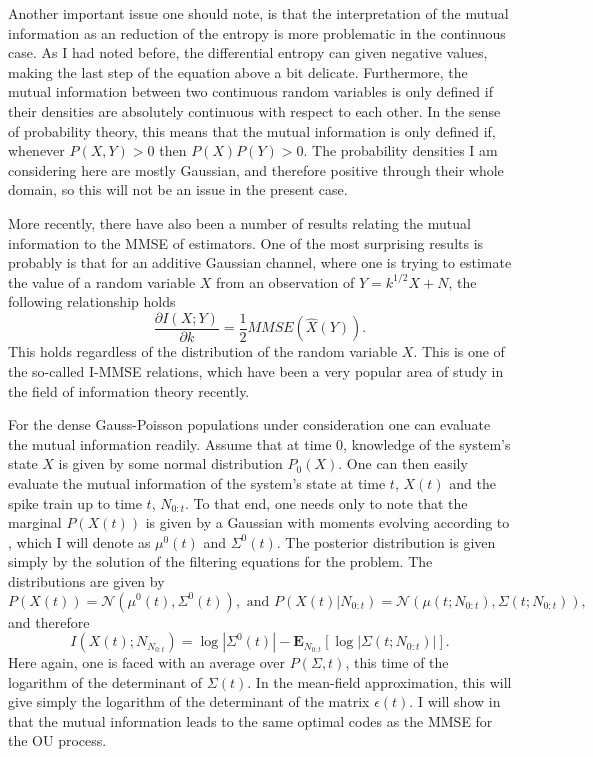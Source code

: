 Another important issue one should note, is that the interpretation of the mutual information as an reduction of the entropy is more problematic in the continuous case. As I had noted 
before, the differential entropy can given negative values, making the last step of the equation above a bit delicate. Furthermore, the mutual information between two continuous 
random variables is only defined if their densities are absolutely continuous with respect to each other. In the sense of probability theory, this means that the mutual information is only
defined if, whenever $P(X,Y) > 0$ then $P(X)P(Y) > 0$. The probability densities I am considering here are mostly Gaussian, and therefore positive through their whole domain, so
this will not be an issue in the present case.\par

More recently, there have also been a number of results relating the mutual information to the MMSE of estimators. One of the most surprising results is probably is that for an additive
Gaussian channel, where one is trying to estimate the value of a random variable $X$ from an observation of $Y = k^{1/2} X + N$, the following relationship holds
\[
\frac{\partial I(X;Y)}{\partial k} = \frac{1}{2} MMSE(\hat{X}(Y)).
\]
This holds regardless of the distribution of the random variable $X$.
This is one of the so-called I-MMSE relations, which have been a very popular area of study in the field of information theory recently.

For the dense Gauss-Poisson populations under consideration one can evaluate the mutual information readily. Assume that at time 0, knowledge of the
system's state $X$ is given by some normal distribution $P_0(X)$. One can then easily evaluate the mutual information of the system's
state at time $t$, $X(t)$ and the spike train up to time $t$, $N_{0:t}$. To that end, one needs only to note that the marginal $P(X(t))$ is given by a Gaussian with
moments evolving according to , which I will denote as $\mu^0(t)$ and $\Sigma^0(t)$. The posterior distribution is given simply
by the solution of the filtering equations for the problem. The distributions are given by
\[
P(X(t)) = \mathcal{N}(\mu^0(t),\Sigma^0(t)), \textrm{ and } P(X(t) | N_{0:t}) = \mathcal{N}(\mu(t; N_{0:t}), \Sigma(t; N_{0:t})),
\]
and therefore
\[
I(X(t);N_{N_{0:t}}) = \log |\Sigma^0(t)| - \boldsymbol{E}_{N_{0:t}}\left[\log |\Sigma(t; N_{0:t})|\right].
\]
Here again, one is faced with an average over $P(\Sigma,t)$, this time of the logarithm of the determinant of $\Sigma(t)$. In the mean-field approximation, this will give simply the
logarithm of the determinant of the matrix $\epsilon(t)$. I will show in  that the mutual information leads to the same optimal codes as the MMSE for the OU process.

